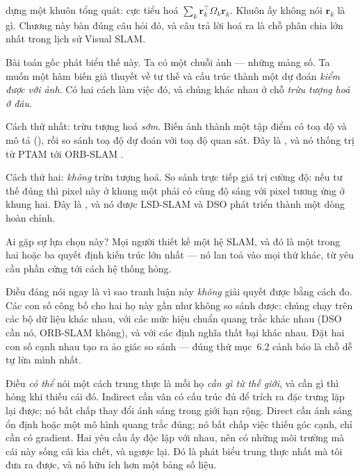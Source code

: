 \documentclass[../../vslam.tex]{subfiles}
\begin{document}
 dựng một khuôn tổng quát: cực tiểu hoá \(\sum_k \mathbf{r}_k^\top \Omega_k \mathbf{r}_k\). Khuôn ấy không nói \(\mathbf{r}_k\) là gì. Chương này bàn đúng câu hỏi đó, và câu trả lời hoá ra là chỗ phân chia lớn nhất trong lịch sử Visual SLAM.

Bài toán gốc phát biểu thế này. Ta có một chuỗi ảnh --- những mảng số. Ta muốn một hàm biến giả thuyết về tư thế và cấu trúc thành một dự đoán \emph{kiểm được với ảnh}. Có hai cách làm việc đó, và chúng khác nhau ở chỗ \emph{trừu tượng hoá ở đâu}.

Cách thứ nhất: trừu tượng hoá \emph{sớm}. Biến ảnh thành một tập điểm có toạ độ và mô tả (), rồi so sánh toạ độ dự đoán với toạ độ quan sát. Đây là , và nó thống trị từ PTAM \cite{klein2007ptam} tới ORB-SLAM \cite{murartal2015orbslam}.

Cách thứ hai: \emph{không} trừu tượng hoá. So sánh trực tiếp giá trị cường độ: nếu tư thế đúng thì pixel này ở khung một phải có cùng độ sáng với pixel tương ứng ở khung hai. Đây là , và nó được LSD-SLAM \cite{engel2014lsdslam} và DSO \cite{engel2018dso} phát triển thành một dòng hoàn chỉnh.

Ai gặp sự lựa chọn này? Mọi người thiết kế một hệ SLAM, và đó là một trong hai hoặc ba quyết định kiến trúc lớn nhất --- nó lan toả vào mọi thứ khác, từ yêu cầu phần cứng tới cách hệ thống hỏng.

Điều đáng nói ngay là vì sao tranh luận này \emph{không} giải quyết được bằng cách đo. Các con số công bố cho hai họ này gần như không so sánh được: chúng chạy trên các bộ dữ liệu khác nhau, với các mức hiệu chuẩn quang trắc khác nhau (DSO cần nó, ORB-SLAM không), và với các định nghĩa thất bại khác nhau. Đặt hai con số cạnh nhau tạo ra ảo giác so sánh --- đúng thứ  mục~6.2 cảnh báo là chỗ dễ tự lừa mình nhất.

Điều \emph{có thể} nói một cách trung thực là mỗi họ \emph{cần gì từ thế giới}, và cần gì thì hỏng khi thiếu cái đó. Indirect cần vân có cấu trúc đủ để trích ra đặc trưng lặp lại được; nó bất chấp thay đổi ánh sáng trong giới hạn rộng. Direct cần ánh sáng ổn định hoặc một mô hình quang trắc đúng; nó bất chấp việc thiếu góc cạnh, chỉ cần có gradient. Hai yêu cầu ấy độc lập với nhau, nên có những môi trường mà cái này sống cái kia chết, và ngược lại. Đó là phát biểu trung thực nhất mà tôi đưa ra được, và nó hữu ích hơn một bảng số liệu.
\end{document}
